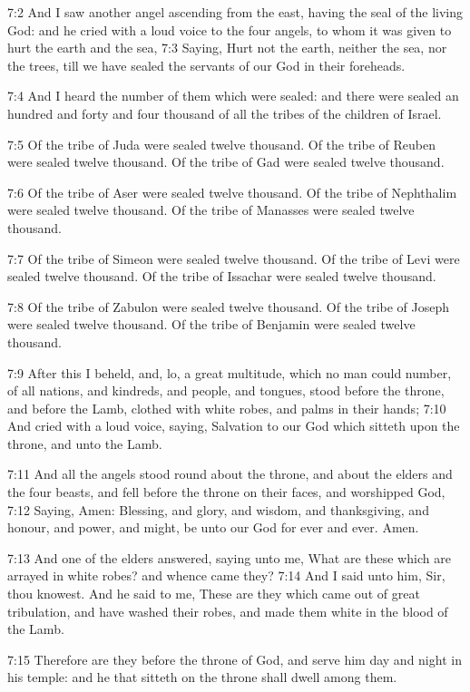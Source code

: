 7:2 And I saw another angel ascending from the east, having the seal of the living God: and he cried with a loud voice to the four angels, to whom it was given to hurt the earth and the sea, 7:3 Saying, Hurt not the earth, neither the sea, nor the trees, till we have sealed the servants of our God in their foreheads.

7:4 And I heard the number of them which were sealed: and there were sealed an hundred and forty and four thousand of all the tribes of the children of Israel.

7:5 Of the tribe of Juda were sealed twelve thousand. Of the tribe of Reuben were sealed twelve thousand. Of the tribe of Gad were sealed twelve thousand.

7:6 Of the tribe of Aser were sealed twelve thousand. Of the tribe of Nephthalim were sealed twelve thousand. Of the tribe of Manasses were sealed twelve thousand.

7:7 Of the tribe of Simeon were sealed twelve thousand. Of the tribe of Levi were sealed twelve thousand. Of the tribe of Issachar were sealed twelve thousand.

7:8 Of the tribe of Zabulon were sealed twelve thousand. Of the tribe of Joseph were sealed twelve thousand. Of the tribe of Benjamin were sealed twelve thousand.

7:9 After this I beheld, and, lo, a great multitude, which no man could number, of all nations, and kindreds, and people, and tongues, stood before the throne, and before the Lamb, clothed with white robes, and palms in their hands; 7:10 And cried with a loud voice, saying, Salvation to our God which sitteth upon the throne, and unto the Lamb.

7:11 And all the angels stood round about the throne, and about the elders and the four beasts, and fell before the throne on their faces, and worshipped God, 7:12 Saying, Amen: Blessing, and glory, and wisdom, and thanksgiving, and honour, and power, and might, be unto our God for ever and ever. Amen.

7:13 And one of the elders answered, saying unto me, What are these which are arrayed in white robes? and whence came they?  7:14 And I said unto him, Sir, thou knowest. And he said to me, These are they which came out of great tribulation, and have washed their robes, and made them white in the blood of the Lamb.

7:15 Therefore are they before the throne of God, and serve him day and night in his temple: and he that sitteth on the throne shall dwell among them.

